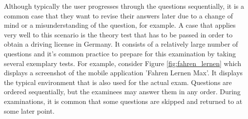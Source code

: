 \documentclass{sig-alternate-05-2015}
\begin{document}
Although typically the user progresses through the questions sequentially, it is a
common case that they want to revise their answers later due to a change of
mind or a misunderstanding of the question, for example. A case that applies very
well to this scenario is the theory test that has to be passed in order to obtain
a driving license in Germany. It consists of a relatively large number of questions and it's common practice to prepare for this examination by taking several exemplary tests. For example, consider Figure \ref{fig:fahren_lernen} which displays a screenshot of the
mobile application 'Fahren Lernen Max'. It displays the typical environment that
is also used for the actual exam. Questions are ordered sequentially, but the examinees
may answer them in any order. During examinations, it is common that some questions are
skipped and returned to at some later point.
\end{document}
